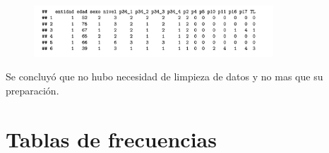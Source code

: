 \documentclass[aps,reprint]{revtex4-2}
\begin{document}
\begin{widetext}
\begin{figure}[H]
  \centering
  \includegraphics[width=0.8\textwidth]{Screenshot 2025-10-25 at 18.23.59.png}
\end{figure}
\end{widetext}

Se concluyó que no hubo necesidad de limpieza de datos y no mas que su preparación.

\section{Tablas de frecuencias}\label{tab_frec}
\end{document}
